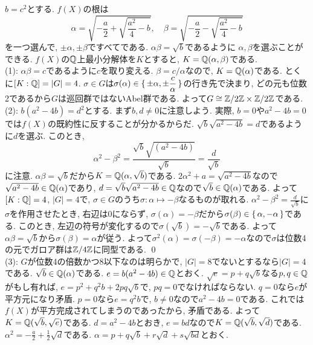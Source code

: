 \begin{egans}
$b=c^2$とする. $f(X)$の根は
\[\alpha = \sqrt{-\dfrac{a}{2} +\sqrt{\dfrac{a^2}{4} - b}},\quad  \beta = \sqrt{-\dfrac{a}{2} - \sqrt{\dfrac{a^2}{4} - b}}\]
を一つ選んで, $\pm \alpha, \pm \beta$ですべてである. $\alpha\beta = \sqrt{b}$であるように $\alpha,\beta$を選ぶことができる. $f(X)$の$\mathbb{Q}$上最小分解体を$K$とすると, $K=\mathbb{Q}(\alpha,\beta)$である. \\
(1): $\alpha\beta = c$であるように$c$を取り変える. $\beta = c/\alpha$なので, $K=\mathbb{Q}(\alpha)$である. とくに$[K:\mathbb{Q}] = |G| = 4$. $\sigma\in G$は$\sigma(\alpha)\in \set{\pm \alpha, \pm \dfrac{c}{\alpha}}$の行き先で決まり, どの元も位数2であるから$G$は巡回群ではないAbel群である. よって$G\cong \mathbb{Z}/2\mathbb{Z}\times \mathbb{Z}/2\mathbb{Z}$である. \\
(2): $b(a^2-4b) = d^2$とする. まず$b,d\neq 0$に注意しよう. 実際, $b=0$や$a^2-4b = 0$では$f(X)$の既約性に反することが分かるからだ. $\sqrt{b}\sqrt{a^2-4b} = d$であるように$d$を選ぶ. このとき,
\[\alpha^2 -\beta^2 = \dfrac{\sqrt{b}\sqrt{(a^2-4b)}}{\sqrt{b}} = \dfrac{d}{\sqrt{b}}\]
に注意. $\alpha\beta = \sqrt{b}$だから$K=\mathbb{Q}(\alpha,\sqrt{b})$である. $2\alpha^2 + a = \sqrt{a^2-4b}$なので$\sqrt{a^2-4b} \in \mathbb{Q}(\alpha)$であり, $d=\sqrt{b}\sqrt{a^2-4b}\in \mathbb{Q}$なので$\sqrt{b}\in \mathbb{Q}(\alpha)$である. よって$[K:\mathbb{Q}] = 4$, $|G| = 4$で, $\sigma\in G$のうち$\sigma:\alpha\mapsto -\beta$なるものが取れる. $\alpha^2-\beta^2 = \frac{d}{\sqrt{b}}$に$\sigma$を作用させたとき, 右辺は0にならず, $\sigma(\alpha) = -\beta$だから$\sigma(\beta) \in \set{\alpha,-\alpha}$である. このとき, 左辺の符号が変化するので$\sigma(\sqrt{b}) = -\sqrt{b}$である. よって$\alpha\beta = \sqrt{b}$から$\sigma(\beta) = \alpha$が従う. よって$\sigma^2(\alpha) =\sigma(-\beta) = -\alpha$なので$\sigma$は位数4の元でガロア群は$\mathbb{Z}/4\mathbb{Z}$に同型である. \qed \\
(3): $G$が位数4の倍数かつ8以下なのは明らかで, $|G|=8$でないとするなら$|G| = 4$である. $\sqrt{b} \in \mathbb{Q}(\alpha)$である. $e=b(a^2-4b)\in \mathbb{Q}$とおく. $\sqrt{e} = p+q\sqrt{b}$なる$p,q\in \mathbb{Q}$がもし有れば, $e=p^2 + q^2b + 2pq\sqrt{b}$で, $pq=0$でなければならない. $q=0$なら$e$が平方元になり矛盾. $p=0$なら$e=q^2b$で, $b\neq 0$なので$a^2-4b = 0$である. これでは$f(X)$が平方完成されてしまうのであったから, 矛盾である. よって$K=\mathbb{Q}(\sqrt{b},\sqrt{e})$である. $d=a^2-4b$とおき, $e=bd$なので$K=\mathbb{Q}(\sqrt{b},\sqrt{d})$である. $\alpha^2 = -\frac{a}{2} + \frac{1}{2}\sqrt{d}$である. $\alpha = p+q\sqrt{b}+r\sqrt{d} + s\sqrt{bd}$とおく.

\end{egans}
